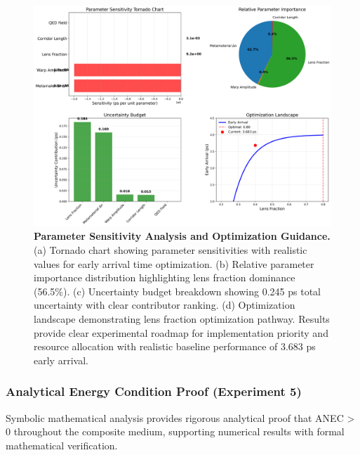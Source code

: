 \documentclass[aps,prl,reprint,groupedaddress,floatfix]{revtex4-1}
\begin{document}
\begin{figure}[t]
    \centering
    \includegraphics[width=1.0\textwidth]{experiment4_parameter_sensitivity.png}
    \caption{\textbf{Parameter Sensitivity Analysis and Optimization Guidance.} (a) Tornado chart showing parameter sensitivities with realistic values for early arrival time optimization. (b) Relative parameter importance distribution highlighting lens fraction dominance (56.5\%). (c) Uncertainty budget breakdown showing 0.245 ps total uncertainty with clear contributor ranking. (d) Optimization landscape demonstrating lens fraction optimization pathway. Results provide clear experimental roadmap for implementation priority and resource allocation with realistic baseline performance of 3.683 ps early arrival.}
    \label{fig:sensitivity_analysis}
\end{figure}

\subsubsection{Analytical Energy Condition Proof (Experiment 5)}

Symbolic mathematical analysis provides rigorous analytical proof that ANEC > 0 throughout the composite medium, supporting numerical results with formal mathematical verification.
\end{document}
